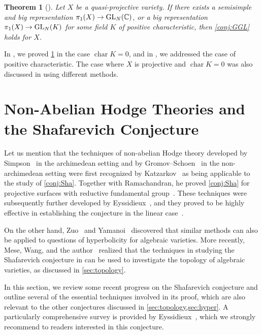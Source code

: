 \documentclass[english]{amsproc}
\theoremstyle{plain}
\newtheorem{thm}{Theorem}[section]
\theoremstyle{definition}
\theoremstyle{remark}
\theoremstyle{plain}
\numberwithin{equation}{thm} %
\newcommand{\GL}{{\rm GL}}
\begin{document}

\begin{thm}[\cite{CDY22,DY23b}]\label{thm:GGL}
	Let $X$ be a quasi-projective variety. If there exists a semisimple and big representation $\pi_1(X)\to \GL_N(\mathbb{C})$, or a big representation $\pi_1(X)\to \GL_N(K)$ for some field $K$ of positive characteristic, then \cref{conj:GGL} holds for $X$.
\end{thm}
In \cite{CDY22}, we proved \cref{thm:GGL} in the case $\operatorname{char} K = 0$, and in \cite{DY23b}, we addressed the case of positive characteristic.  The case where $X$ is projective and $\operatorname{char} K = 0$ was also discussed in \cite{Bru22} using different methods.




\section{Non-Abelian Hodge Theories and the Shafarevich Conjecture}\label{sec:sha}
Let us mention that the techniques of non-abelian Hodge theory developed by Simpson~\cite{Sim92} in the archimedean setting and by Gromov--Schoen~\cite{GS92} in the non-archimedean setting were first recognized by Katzarkov~\cite{Kat97} as being applicable to the study of \cref{conj:Sha}. 
Together with Ramachandran, he proved \cref{conj:Sha} for projective surfaces with reductive fundamental group~\cite{KR98}. 
These techniques were subsequently further developed by Eyssidieux~\cite{Eys04}, and they proved to be highly effective in establishing the conjecture in the linear case~\cite{EKPR12}.

On the other hand, Zuo~\cite{Zuo96} and Yamanoi~\cite{Yam10} discovered that similar methods can also be applied to questions of hyperbolicity for algebraic varieties. 
More recently, Mese, Wang, and the author~\cite{DW24,DW24b,DMW24} realized that the techniques in studying the Shafarevich conjecture in \cite{Eys04,EKPR12,DY23,DY23b} can be used to investigate the topology of algebraic varieties, as discussed in \cref{sec:topology}.

In this section, we review some recent progress on the Shafarevich conjecture and outline several of the essential techniques involved in its proof, which are also relevant to the other conjectures discussed in \cref{sec:topology,sec:hyper}. 
A particularly  comprehensive survey is provided by Eyssidieux~\cite{Eys11}, which we strongly recommend to readers interested in this conjecture. 
 
\end{document}
